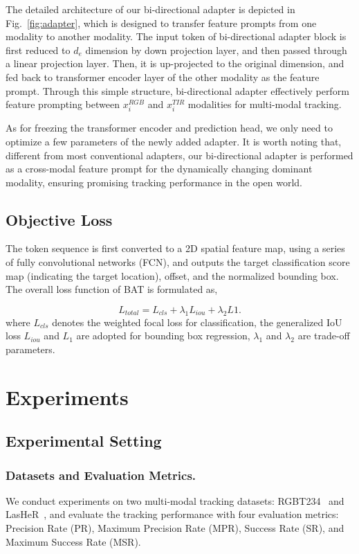 \documentclass[letterpaper]{article} %
\begin{document}
The detailed architecture of our bi-directional adapter is depicted in Fig.~\ref{fig:adapter}, which is designed to transfer feature prompts from one modality to another modality. 
The input token of bi-directional adapter block is first reduced to $d_e$ dimension by down projection layer, and then passed through a linear projection layer.
Then, it is up-projected to the original dimension, and fed back to transformer encoder layer of the other modality as the feature prompt. Through this simple structure, bi-directional adapter effectively perform feature prompting between $x_{i}^{RGB}$ and $x_{i}^{TIR}$ modalities for multi-modal tracking.

As for freezing the transformer encoder and prediction head, we only need to optimize a few parameters of the newly added adapter. It is worth noting that, different from most conventional adapters, our bi-directional adapter is performed as a cross-modal feature prompt for the dynamically changing dominant modality, ensuring promising tracking performance in the open world.




\subsection{Objective Loss} 

The token sequence is first converted to a 2D spatial feature map, using a series of fully convolutional networks (FCN), and outputs the target classification score map (indicating the target location), offset, and the normalized bounding box.
The overall loss function of BAT is formulated as,

\begin{equation}
L_{total} = L_{cls} + \lambda_1L_{iou} + \lambda_2L1.
\end{equation}
where $L_{cls}$ denotes the weighted focal loss for classification, the generalized IoU loss $L_{iou}$ and $L_1$ are adopted for bounding box regression, ${\lambda}_{1}$ and ${\lambda}_2$ are trade-off parameters.



\section{Experiments}

\subsection{Experimental Setting}
\subsubsection{Datasets and Evaluation Metrics.}
We conduct experiments on two multi-modal tracking datasets: RGBT234~\cite{rgbt234} and LasHeR~\cite{LasHeR}, and evaluate the tracking performance with four evaluation metrics: Precision Rate (PR), Maximum Precision Rate (MPR), Success Rate (SR), and Maximum Success Rate (MSR).
\end{document}
